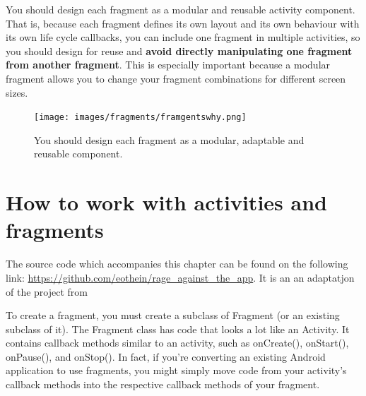 You should design each fragment as a modular and reusable activity component. That is, because each fragment defines its own layout and its own behaviour with its own life cycle callbacks, you can include one fragment in multiple activities, so you should design for reuse and \textbf{avoid directly manipulating one fragment from another fragment}. This is especially important because a modular fragment allows you to change your fragment combinations for different screen sizes.

\begin{figure}
	\centering
	\texttt{[image: images/fragments/framgentswhy.png]}
	\label{fig:whyfragments}
	\caption{You should design each fragment as a modular, adaptable and reusable component.}
\end{figure}

\section{How to work with activities and fragments}
\begin{framed}
	The source code which accompanies this chapter can be found on the following link: \url{https://github.com/eothein/rage_against_the_app}. It is an an adaptatjon of the project from \cite{Gleason2017a}

\end{framed}

To create a fragment, you must create a subclass of Fragment (or an existing subclass of it). The Fragment class has code that looks a lot like an Activity. It contains callback methods similar to an activity, such as onCreate(), onStart(), onPause(), and onStop(). In fact, if you're converting an existing Android application to use fragments, you might simply move code from your activity's callback methods into the respective callback methods of your fragment.

